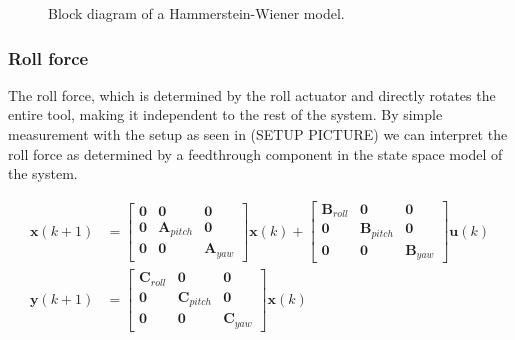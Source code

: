 \begin{figure} \label{weiner}
\caption{Block diagram of a Hammerstein-Wiener model.}
\end{figure}

\subsubsection{Roll force}
The roll force, which is determined by the roll actuator and directly rotates the entire tool, making it independent to the rest of the system.
By simple measurement with the setup as seen in (SETUP PICTURE) we can interpret the roll force as determined by a feedthrough component in the state space model of the system.

\begin{align}\label{eq:allSS}
\mathbf{x}(k+1) &= 
\begin{bmatrix} \mathbf{0} & \mathbf{0} & \mathbf{0}\\
 \mathbf{0} & \mathbf{A}_{pitch} &\mathbf{0}\\
 \mathbf{0} &\mathbf{0} & \mathbf{A}_{yaw}  \end{bmatrix} 
 \mathbf{x}(k) + 
\begin{bmatrix} \mathbf{B}_{roll} & \mathbf{0} & \mathbf{0}\\
 \mathbf{0} & \mathbf{B}_{pitch} &\mathbf{0}\\
 \mathbf{0} &\mathbf{0} & \mathbf{B}_{yaw}  \end{bmatrix} 
 \mathbf{u}(k)\\
\mathbf{y}(k+1) &= 
\begin{bmatrix} \mathbf{C}_{roll} & \mathbf{0} & \mathbf{0}\\
 \mathbf{0} & \mathbf{C}_{pitch} &\mathbf{0}\\
 \mathbf{0} &\mathbf{0} & \mathbf{C}_{yaw}  \end{bmatrix} 
\mathbf{x}(k) 
\end{align}

